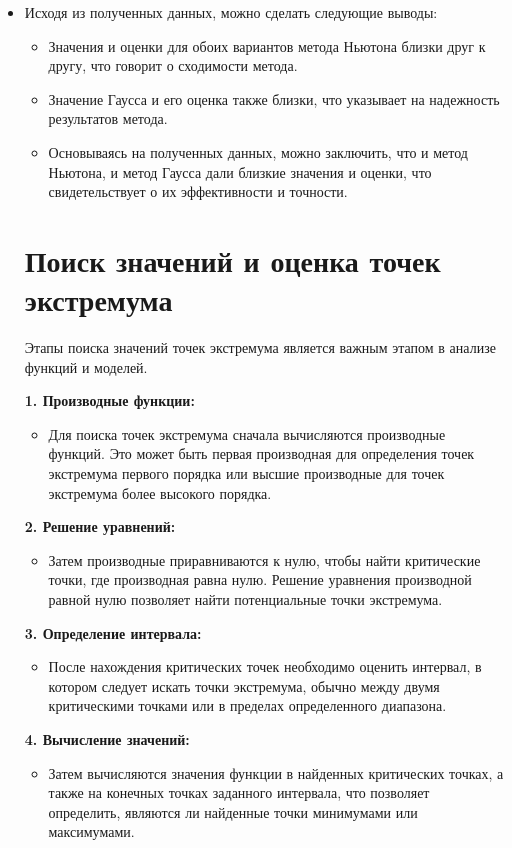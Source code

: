 \documentclass{article}
\begin{document}
\begin{itemize}
\item Исходя из полученных данных, можно сделать следующие выводы: 
\begin{itemize}
    \item Значения и оценки для обоих вариантов метода Ньютона близки друг к другу, что говорит о сходимости метода.
    \item Значение Гаусса и его оценка также близки, что указывает на надежность результатов метода.
    \item Основываясь на полученных данных, можно заключить, что и метод Ньютона, и метод Гаусса дали близкие значения и оценки, что свидетельствует о их эффективности и точности.

\end{itemize}

\section*{Поиск значений и оценка точек экстремума}

Этапы поиска значений точек экстремума является важным этапом в анализе функций и моделей.

\textbf{1. Производные функции:}
\begin{itemize}
    \item Для поиска точек экстремума сначала вычисляются производные функций. Это может быть первая производная для определения точек экстремума первого порядка или высшие производные для точек экстремума более высокого порядка.
\end{itemize}

\textbf{2. Решение уравнений:}
\begin{itemize}
    \item Затем производные приравниваются к нулю, чтобы найти критические точки, где производная равна нулю. Решение уравнения производной равной нулю позволяет найти потенциальные точки экстремума.
\end{itemize}

\textbf{3. Определение интервала:}
\begin{itemize}
    \item После нахождения критических точек необходимо оценить интервал, в котором следует искать точки экстремума, обычно между двумя критическими точками или в пределах определенного диапазона.
\end{itemize}

\textbf{4. Вычисление значений:}
\begin{itemize}
    \item Затем вычисляются значения функции в найденных критических точках, а также на конечных точках заданного интервала, что позволяет определить, являются ли найденные точки минимумами или максимумами.
\end{itemize}


\end{itemize}
\end{document}

